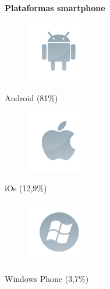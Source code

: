 \begin{slide}
  \begin{block}{\textbf{Plataformas smartphone}}
    \begin{center}
      \begin{minipage}[b]{0.4\linewidth}
        \begin{center}
          \begin{figure}[!h]
            \includegraphics[height=0.25\textheight]{img/android.png}
          \end{figure}
          Android (81\%)
        \end{center}
      \end{minipage}
      \vspace{0.5cm}
      \begin{minipage}[b]{0.4\linewidth}
        \begin{center}
          \begin{figure}[!h]
            \includegraphics[height=0.25\textheight]{img/ios.png}
          \end{figure}
          iOs (12,9\%)
        \end{center}
      \end{minipage}
      \begin{minipage}[b]{0.4\linewidth}
        \begin{center}
          \begin{figure}[!h]
            \includegraphics[height=0.25\textheight]{img/wphone.png}
          \end{figure}
          Windows Phone (3,7\%)
        \end{center}

\end{minipage}
\end{center}
\end{block}
\end{slide}
